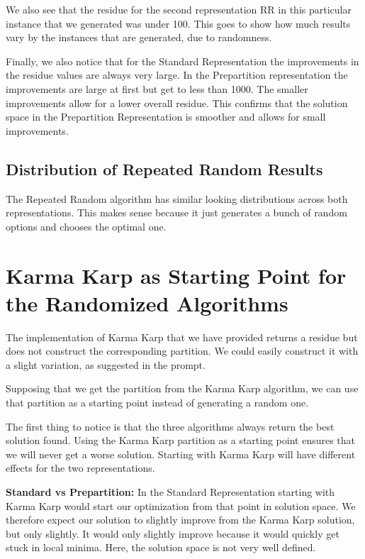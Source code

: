 \documentclass[11pt]{article}
\begin{document}
We also see that the residue for the second representation RR in this particular instance that we generated was under 100. This goes to show how much results vary by the instances that are generated, due to randomness. 

Finally, we also notice that for the Standard Representation the improvements in the residue values are always very large. In the Prepartition representation the improvements are large at first   but get to less than 1000. The smaller improvements allow for a lower overall residue. This confirms that the solution space in the Prepartition Representation is smoother and allows for small improvements. 

\subsection{Distribution of Repeated Random Results}
The Repeated Random algorithm has similar looking distributions across both representations. This makes sense because it just generates a bunch of random options and chooses the optimal one.



\section{Karma Karp as Starting Point for the Randomized Algorithms}
The implementation of Karma Karp that we have provided returns a residue but does not construct the corresponding partition. We could easily construct it with a slight variation, as suggested in the prompt.

Supposing that we get the partition from the Karma Karp algorithm, we can use that partition as a starting point instead of generating a random one.

The first thing to notice is that the three algorithms always return the best solution found. Using the Karma Karp partition as a starting point ensures that we will never get a worse solution. Starting with Karma Karp will have different effects for the two representations.

\textbf{Standard vs Prepartition:}
In the Standard Representation starting with Karma Karp would start our optimization from that point in solution space. We therefore expect our solution to slightly improve from the Karma Karp solution, but only slightly. It would only slightly improve because it would quickly get stuck in local minima. Here, the solution space is not very well defined. 
\end{document}
